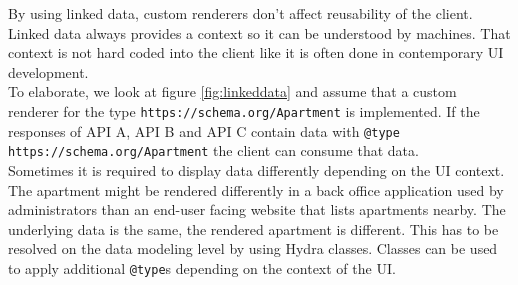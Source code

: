 By using \gls{linked data}, custom renderers don't affect reusability of the client. Linked data always provides a context so it can be understood by machines. That context is not hard coded into the client like it is often done in contemporary UI development. \\
To elaborate, we look at figure \ref{fig:linkeddata} and assume that a custom renderer for the type \lstinline{https://schema.org/Apartment} is implemented. If the responses of API A, API B and API C contain data with \lstinline{@type} \lstinline{https://schema.org/Apartment} the client can consume that data. \\
Sometimes it is required to display data differently depending on the UI context. The apartment might be rendered differently in a back office application used by administrators than an end-user facing website that lists apartments nearby. The underlying data is the same, the rendered apartment is different. This has to be resolved on the data modeling level by using Hydra classes. Classes can be used to apply additional \lstinline{@type}s depending on the context of the UI.
